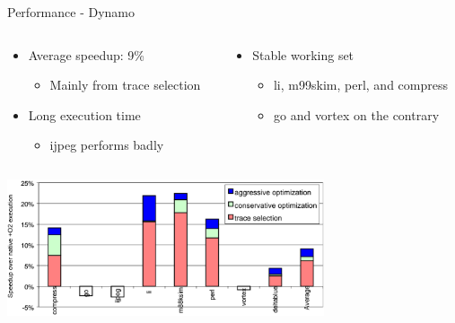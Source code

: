 \documentclass[aspectratio=169,xcolor=x11names]{beamer}
\begin{document}
	\begin{frame}{Performance - Dynamo}
		\begin{columns}
			\begin{column}[b]{0.5\linewidth}
				\begin{itemize}
					\item Average speedup: 9\%
					\begin{itemize}
						\item Mainly from trace selection
					\end{itemize}
					\item Long execution time
					\begin{itemize}
						\item \alert{ijpeg} performs badly
					\end{itemize}
				\end{itemize}
			\end{column}
			\begin{column}[b]{0.5\linewidth}
				\begin{itemize}
					\item Stable working set
					\begin{itemize}
						\item \alert{li}, \alert{m99skim}, \alert{perl}, and \alert{compress}
						\item \alert{go} and \alert{vortex} on the contrary
					\end{itemize}
				\end{itemize}
			\end{column}
		\end{columns}
		\begin{center}
			\includegraphics[width=0.7\textwidth]{Dynamo-speedup}
		\end{center}
	\end{frame}
\end{document}

